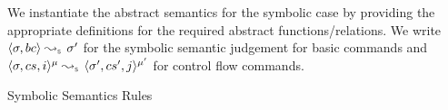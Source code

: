 We instantiate the abstract semantics for the symbolic case by providing the appropriate definitions 
for the required abstract functions/relations. 
We write $\absbsemrule{\jstate, \bcmd}{\jstate'}{\symbolic}$ for the symbolic semantic 
judgement for basic commands and $\abssemrule{\jstate, \cs, i}{\jstate', \cs', j}{\mode}{\mode'}{\symbolic}$ 
for control flow commands. 

\vspace{5pt}
\begin{display}{Symbolic Semantics Rules}
\end{display}
